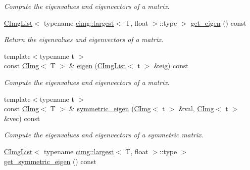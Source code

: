 \begin{DoxyCompactItemize}
\begin{DoxyCompactList}\small\item\em Compute the eigenvalues and eigenvectors of a matrix. \item\end{DoxyCompactList}\item 
\hypertarget{structcimg__library_1_1_c_img_ac807a864f151b566eb14425137adaad1}{
\hyperlink{structcimg__library_1_1_c_img_list}{CImgList}$<$ typename \hyperlink{structcimg__library_1_1cimg_1_1largest}{cimg::largest}$<$ T, float $>$::type $>$ \hyperlink{structcimg__library_1_1_c_img_ac807a864f151b566eb14425137adaad1}{get\_\-eigen} () const }
\label{structcimg__library_1_1_c_img_ac807a864f151b566eb14425137adaad1}

\begin{DoxyCompactList}\small\item\em Return the eigenvalues and eigenvectors of a matrix. \item\end{DoxyCompactList}\item 
\hypertarget{structcimg__library_1_1_c_img_ae71df6efd3bac834eae29e84bf79e71c}{
{\footnotesize template$<$typename t $>$ }\\const \hyperlink{structcimg__library_1_1_c_img}{CImg}$<$ T $>$ \& \hyperlink{structcimg__library_1_1_c_img_ae71df6efd3bac834eae29e84bf79e71c}{eigen} (\hyperlink{structcimg__library_1_1_c_img_list}{CImgList}$<$ t $>$ \&eig) const }
\label{structcimg__library_1_1_c_img_ae71df6efd3bac834eae29e84bf79e71c}

\begin{DoxyCompactList}\small\item\em Compute the eigenvalues and eigenvectors of a matrix. \item\end{DoxyCompactList}\item 
\hypertarget{structcimg__library_1_1_c_img_aa7a445de07be7553058e6038c1574dd0}{
{\footnotesize template$<$typename t $>$ }\\const \hyperlink{structcimg__library_1_1_c_img}{CImg}$<$ T $>$ \& \hyperlink{structcimg__library_1_1_c_img_aa7a445de07be7553058e6038c1574dd0}{symmetric\_\-eigen} (\hyperlink{structcimg__library_1_1_c_img}{CImg}$<$ t $>$ \&val, \hyperlink{structcimg__library_1_1_c_img}{CImg}$<$ t $>$ \&vec) const }
\label{structcimg__library_1_1_c_img_aa7a445de07be7553058e6038c1574dd0}

\begin{DoxyCompactList}\small\item\em Compute the eigenvalues and eigenvectors of a symmetric matrix. \item\end{DoxyCompactList}\item 
\hypertarget{structcimg__library_1_1_c_img_a1b0a43884307e3ee41abc3e116d3221c}{
\hyperlink{structcimg__library_1_1_c_img_list}{CImgList}$<$ typename \hyperlink{structcimg__library_1_1cimg_1_1largest}{cimg::largest}$<$ T, float $>$::type $>$ \hyperlink{structcimg__library_1_1_c_img_a1b0a43884307e3ee41abc3e116d3221c}{get\_\-symmetric\_\-eigen} () const }
\label{structcimg__library_1_1_c_img_a1b0a43884307e3ee41abc3e116d3221c}


\end{DoxyCompactItemize}
